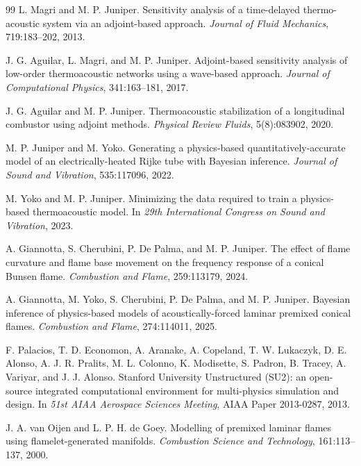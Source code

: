 \documentclass{iopconfser}
\begin{document}
\begin{thebibliography}{99}
\newblock L. Magri and M. P. Juniper.
\newblock Sensitivity analysis of a time-delayed thermo-acoustic system via an adjoint-based approach.
\newblock \emph{Journal of Fluid Mechanics}, 719:183--202, 2013.

\newblock J. G. Aguilar, L. Magri, and M. P. Juniper.
\newblock Adjoint-based sensitivity analysis of low-order thermoacoustic networks using a wave-based approach.
\newblock \emph{Journal of Computational Physics}, 341:163--181, 2017.

\newblock J. G. Aguilar and M. P. Juniper.
\newblock Thermoacoustic stabilization of a longitudinal combustor using adjoint methods.
\newblock \emph{Physical Review Fluids}, 5(8):083902, 2020.

\newblock M. P. Juniper and M. Yoko.
\newblock Generating a physics-based quantitatively-accurate model of an electrically-heated Rijke tube with Bayesian inference.
\newblock \emph{Journal of Sound and Vibration}, 535:117096, 2022.

\newblock M. Yoko and M. P. Juniper.
\newblock Minimizing the data required to train a physics-based thermoacoustic model.
\newblock In \emph{29th International Congress on Sound and Vibration}, 2023.

\newblock A. Giannotta, S. Cherubini, P. De Palma, and M. P. Juniper.
\newblock The effect of flame curvature and flame base movement on the frequency response of a conical Bunsen flame.
\newblock \emph{Combustion and Flame}, 259:113179, 2024.

\newblock A. Giannotta, M. Yoko, S. Cherubini, P. De Palma, and M. P. Juniper.
\newblock Bayesian inference of physics-based models of acoustically-forced laminar premixed conical flames.
\newblock \emph{Combustion and Flame}, 274:114011, 2025.

\newblock F. Palacios, T. D. Economon, A. Aranake, A. Copeland, T. W. Lukaczyk,
\newblock D. E. Alonso, A. J. R. Pralits, M. L. Colonno, K. Modisette,
\newblock S. Padron, B. Tracey, A. Variyar, and J. J. Alonso.
\newblock Stanford University Unstructured (SU2): an open-source integrated computational environment for multi-physics simulation and design.
\newblock In \emph{51st AIAA Aerospace Sciences Meeting}, AIAA Paper 2013-0287, 2013.

\newblock J. A. van Oijen and L. P. H. de Goey.
\newblock Modelling of premixed laminar flames using flamelet-generated manifolds.
\newblock \emph{Combustion Science and Technology}, 161:113--137, 2000.


\end{thebibliography}
\end{document}
